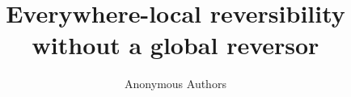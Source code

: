 \documentclass[11pt]{article}
\title{Everywhere-local reversibility\\without a global reversor}
\author{Anonymous Authors}
\date{}
\numberwithin{equation}{section}
\theoremstyle{remark}
\begin{document}
\maketitle
\begin{abstract}

\end{abstract}








\end{document}
